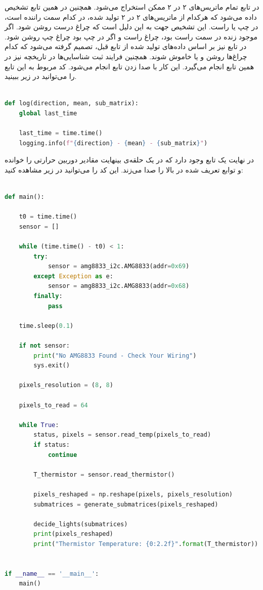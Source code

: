 در تابع  تمام ماتریس‌های ۲ در ۲ ممکن استخراج می‌شود. همچنین در همین تابع تشخیص داده می‌شود که هرکدام از ماتریس‌های ۲ در ۲ تولید شده، در کدام سمت راننده است، در چپ یا راست. این تشخیص جهت به این دلیل است که چراغ درست روشن شود. اگر موجود زنده در سمت راست بود، چراغ راست و اگر در چپ بود چراغ چپ روشن شود. در تابع  نیز بر اساس داده‌های تولید شده از تابع قبل، تصمیم گرفته می‌شود که کدام چراغ‌ها روشن و یا خاموش شوند. همچنین فرایند ثبت شناسایی‌ها در تاریخچه نیز در همین تابع انجام می‌گیرد. این کار با صدا زدن تابع  انجام می‌شود. کد مربوط به این تابع را می‌توانید در زیر ببینید.

\begin{latin}
\begin{lstlisting}[language=python]

def log(direction, mean, sub_matrix):
    global last_time

    last_time = time.time()
    logging.info(f"{direction} - {mean} - {sub_matrix}")

\end{lstlisting}
\end{latin}

در نهایت یک تابع  وجود دارد که در یک حلقه‌ی بینهایت مقادیر دوربین حرارتی را خوانده و توابع تعریف شده در بالا را صدا می‌زند. این کد را می‌توانید در زیر مشاهده کنید:

\begin{latin}
\begin{lstlisting}[language=python]

def main():

    t0 = time.time()
    sensor = []

    while (time.time() - t0) < 1:
        try:
            sensor = amg8833_i2c.AMG8833(addr=0x69)
        except Exception as e:
            sensor = amg8833_i2c.AMG8833(addr=0x68)
        finally:
            pass

    time.sleep(0.1)

    if not sensor:
        print("No AMG8833 Found - Check Your Wiring")
        sys.exit()

    pixels_resolution = (8, 8)

    pixels_to_read = 64

    while True:
        status, pixels = sensor.read_temp(pixels_to_read)
        if status:
            continue

        T_thermistor = sensor.read_thermistor()

        pixels_reshaped = np.reshape(pixels, pixels_resolution)
        submatrices = generate_submatrices(pixels_reshaped)

        decide_lights(submatrices)
        print(pixels_reshaped)
        print("Thermistor Temperature: {0:2.2f}".format(T_thermistor))


if __name__ == '__main__':
    main()

\end{lstlisting}
\end{latin}

